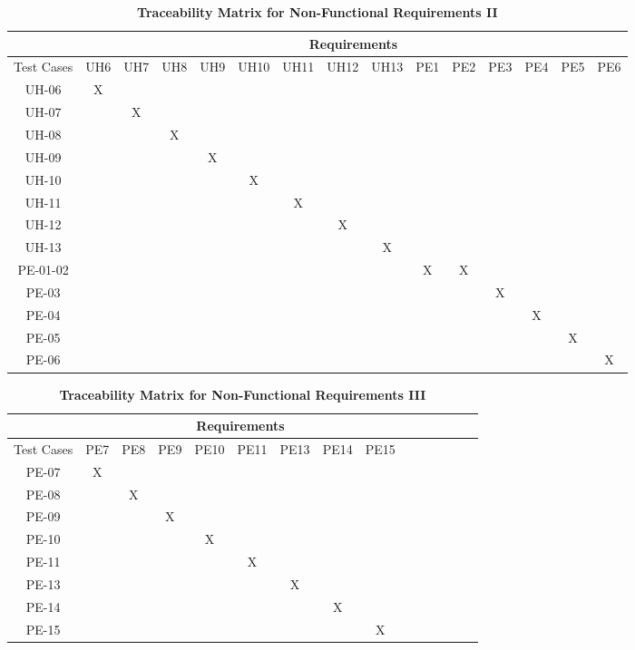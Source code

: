 \documentclass[12pt, titlepage]{article}
\begin{document}
\begin{landscape}
\begin{table}[h!]
\centering
\caption{\textbf{Traceability Matrix for Non-Functional Requirements II}}
\label{tab:trace_matrix_03}
\begin{tabular}{|c|c|c|c|c|c|c|c|c|c|c|c|c|c|c|}
\hline
& \multicolumn{14}{c|}{Requirements} \\
\hline
Test Cases & UH6 & UH7 & UH8 & UH9 & UH10 & UH11 & UH12 & UH13 & PE1 & PE2 & PE3 & PE4 & PE5 & PE6 \\
\hline
UH-06 & X & & & & & & & & & & & & & \\
\hline
UH-07 & & X & & & & & & & & & & & & \\
\hline
UH-08 & & & X & & & & & & & & & & & \\
\hline
UH-09 & & & & X & & & & & & & & & & \\
\hline
UH-10 & & & & & X & & & & & & & & & \\
\hline
UH-11 & & & & & & X & & & & & & & & \\
\hline
UH-12 & & & & & & & X & & & & & & & \\
\hline
UH-13 & & & & & & & & X & & & & & & \\
\hline
PE-01-02 & & & & & & & & & X & X & & & & \\
\hline
PE-03 & & & & & & & & & & & X & & & \\
\hline
PE-04 & & & & & & & & & & & & X & & \\
\hline
PE-05 & & & & & & & & & & & & & X & \\
\hline
PE-06 & & & & & & & & & & & & & & X \\
\hline
\end{tabular}
\end{table}

\newpage

\begin{table}[h!]
\centering
\caption{\textbf{Traceability Matrix for Non-Functional Requirements III}}
\label{tab:trace_matrix_03}
\begin{tabular}{|c|c|c|c|c|c|c|c|c|c|c|c|c|c|c|}
\hline
& \multicolumn{8}{c|}{Requirements} \\
\hline
Test Cases & PE7 & PE8 & PE9 & PE10 & PE11 & PE13 & PE14 & PE15 \\
\hline
PE-07 & X & & & & & & & \\
\hline
PE-08 & & X & & & & & & \\
\hline
PE-09 & & & X & & & & & \\
\hline
PE-10 & & & & X & & & & \\
\hline
PE-11 & & & & & X & & & \\
\hline
PE-13 & & & & & & X & & \\
\hline
PE-14 & & & & & & & X & \\
\hline
PE-15 & & & & & & & & X \\
\hline
\end{tabular}
\end{table}

\end{landscape}
\end{document}

